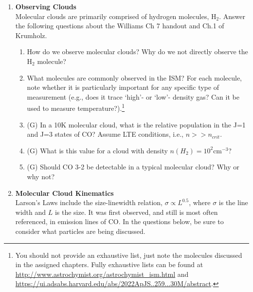 \documentclass{article}
\begin{document}
\begin{enumerate}
\item  \textbf{Observing Clouds} \\
    Molecular clouds are primarily comprised of hydrogen molecules, H$_2$.
    Answer the following questions about the Williams Ch 7 handout
    and Ch.1 of Krumholz.

    \begin{enumerate}
        \item How do we observe molecular clouds?
            Why do we not directly observe the H$_2$ molecule?
        \item What molecules are commonly observed in the ISM?
            For each molecule, note whether it is particularly important for any specific type
            of measurement (e.g., does it trace `high'- or `low'- density gas?  Can it be
            used to measure temperature?).\footnote{
            You should not provide an exhaustive list, just note the molecules discussed in the
            assigned chapters.  Fully exhaustive lists can be found at
            \url{http://www.astrochymist.org/astrochymist_ism.html} and
            \url{https://ui.adsabs.harvard.edu/abs/2022ApJS..259...30M/abstract}.}
        \item (G) In a 10K molecular cloud, what is the relative population in the J=1 and J=3 states of CO?
            Assume LTE conditions, i.e., $n>>n_{crit}$.
        \item (G) What is this value for a cloud with density $n(H_2)=10^2 \mathrm{cm}^{-3}$?
        \item (G) Should CO 3-2 be detectable in a typical molecular cloud?  Why or why not?
    \end{enumerate}

\item \textbf{Molecular Cloud Kinematics} \\

    Larson's Laws include the size-linewidth relation, $\sigma \propto L^{0.5}$, where $\sigma$ is the line width and $L$ is the size.
    It was first observed, and still is most often referenced, in emission lines of CO.
    In the questions below, be sure to consider what particles are being discussed.


\end{enumerate}
\end{document}
